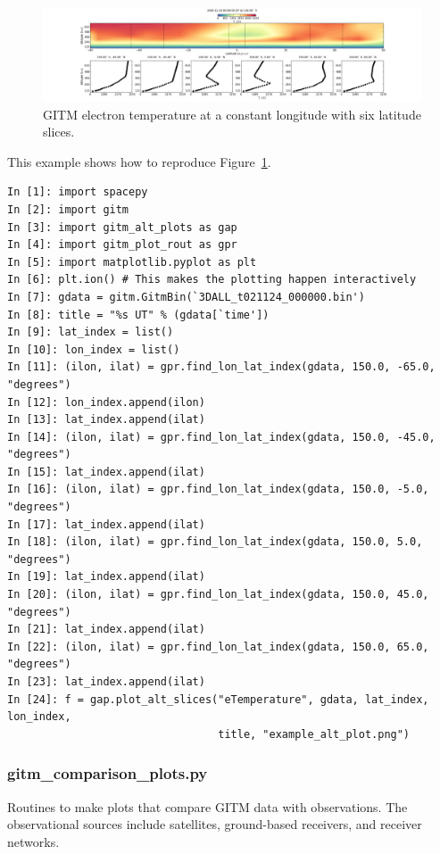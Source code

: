 \begin{figure}
\begin{center}
\noindent\includegraphics[width=\textwidth]{Figures/gitm_alt_slice_test_Te.png}
\caption{GITM electron temperature at a constant longitude with six latitude slices.}
\label{gitm_alt_slices.fig}
\end{center}
\end{figure}

This example shows how to reproduce Figure~\ref{gitm_alt_slices.fig}.

\begin{verbatim}
In [1]: import spacepy
In [2]: import gitm
In [3]: import gitm_alt_plots as gap
In [4]: import gitm_plot_rout as gpr
In [5]: import matplotlib.pyplot as plt
In [6]: plt.ion() # This makes the plotting happen interactively
In [7]: gdata = gitm.GitmBin(`3DALL_t021124_000000.bin')
In [8]: title = "%s UT" % (gdata[`time'])
In [9]: lat_index = list()
In [10]: lon_index = list()
In [11]: (ilon, ilat) = gpr.find_lon_lat_index(gdata, 150.0, -65.0, "degrees")
In [12]: lon_index.append(ilon)
In [13]: lat_index.append(ilat)
In [14]: (ilon, ilat) = gpr.find_lon_lat_index(gdata, 150.0, -45.0, "degrees")
In [15]: lat_index.append(ilat)
In [16]: (ilon, ilat) = gpr.find_lon_lat_index(gdata, 150.0, -5.0, "degrees")
In [17]: lat_index.append(ilat)
In [18]: (ilon, ilat) = gpr.find_lon_lat_index(gdata, 150.0, 5.0, "degrees")
In [19]: lat_index.append(ilat)
In [20]: (ilon, ilat) = gpr.find_lon_lat_index(gdata, 150.0, 45.0, "degrees")
In [21]: lat_index.append(ilat)
In [22]: (ilon, ilat) = gpr.find_lon_lat_index(gdata, 150.0, 65.0, "degrees")
In [23]: lat_index.append(ilat)
In [24]: f = gap.plot_alt_slices("eTemperature", gdata, lat_index, lon_index, 
                                 title, "example_alt_plot.png")
\end{verbatim}

\subsubsection{gitm\_comparison\_plots.py}

Routines to make plots that compare GITM data with observations.  The observational sources include satellites, ground-based receivers, and receiver networks.

